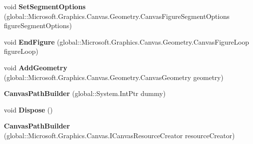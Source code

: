 \begin{DoxyCompactItemize}
\mbox{\label{class_microsoft_1_1_graphics_1_1_canvas_1_1_geometry_1_1_canvas_path_builder_a39666b72c541b2b7bf5ce95ef802b83f}} 
void {\bfseries Set\+Segment\+Options} (global\+::\+Microsoft.\+Graphics.\+Canvas.\+Geometry.\+Canvas\+Figure\+Segment\+Options figure\+Segment\+Options)
\item 
\mbox{\label{class_microsoft_1_1_graphics_1_1_canvas_1_1_geometry_1_1_canvas_path_builder_ae0a5d2f680c829d0627fd7361a291e5b}} 
void {\bfseries End\+Figure} (global\+::\+Microsoft.\+Graphics.\+Canvas.\+Geometry.\+Canvas\+Figure\+Loop figure\+Loop)
\item 
\mbox{\label{class_microsoft_1_1_graphics_1_1_canvas_1_1_geometry_1_1_canvas_path_builder_acb9326bae9395128543ba0a35a264122}} 
void {\bfseries Add\+Geometry} (global\+::\+Microsoft.\+Graphics.\+Canvas.\+Geometry.\+Canvas\+Geometry geometry)
\item 
\mbox{\label{class_microsoft_1_1_graphics_1_1_canvas_1_1_geometry_1_1_canvas_path_builder_a935c167a036e0d8d48a396c57ec7fa62}} 
{\bfseries Canvas\+Path\+Builder} (global\+::\+System.\+Int\+Ptr dummy)
\item 
\mbox{\label{class_microsoft_1_1_graphics_1_1_canvas_1_1_geometry_1_1_canvas_path_builder_a89be25e209b666fcd806f7e81cf7b139}} 
void {\bfseries Dispose} ()
\item 
\mbox{\label{class_microsoft_1_1_graphics_1_1_canvas_1_1_geometry_1_1_canvas_path_builder_a670ec4a87a7f5f8c9ee492317da23aa3}} 
{\bfseries Canvas\+Path\+Builder} (global\+::\+Microsoft.\+Graphics.\+Canvas.\+I\+Canvas\+Resource\+Creator resource\+Creator)
\item 
\mbox{\label{class_microsoft_1_1_graphics_1_1_canvas_1_1_geometry_1_1_canvas_path_builder_af7a65d1c4ea84486b8567a452abaaa82}} 

\end{DoxyCompactItemize}
